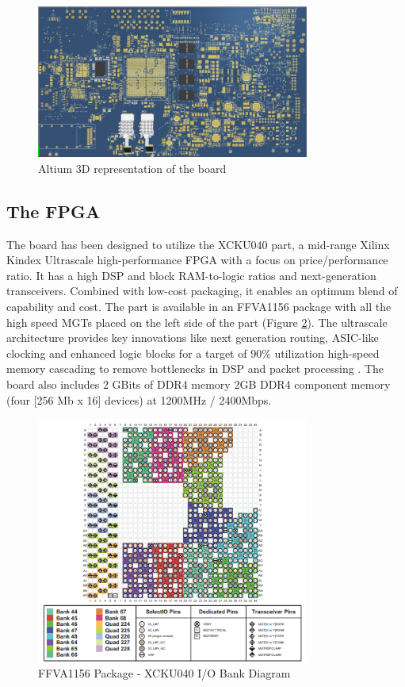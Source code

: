 \documentclass[a4paper]{PoS}
\begin{document}
\begin{figure}[h]
\centering
\includegraphics[width=0.8\textwidth]{board_3D_altium.png}
\caption{Altium 3D representation of the board}
\label{fig1}
\end{figure}



\subsection{The FPGA}
The board has been designed to utilize the XCKU040 part, a  mid-range Xilinx Kindex Ultrascale high-performance FPGA with a focus on price/performance ratio. It has a high DSP and block RAM-to-logic ratios and next-generation transceivers. Combined with low-cost packaging, it enables an optimum blend of capability and cost. The part is available in an FFVA1156 package with all the high speed MGTs  placed on the left side of the part (Figure \ref{xcku040}). The ultrascale architecture provides key innovations like next generation routing, ASIC-like clocking and enhanced logic blocks for a target of 90\% utilization high-speed memory cascading to remove bottlenecks in DSP and packet processing \cite{mehta2013xilinx}.
The board also includes 2 GBits of DDR4 memory 2GB DDR4 component memory (four [256 Mb x 16] devices) at 1200MHz / 2400Mbps.

\begin{figure}[h]
\centering
\includegraphics[width=0.8\textwidth]{xcku040_pinout.png}
\caption{FFVA1156 Package - XCKU040 I/O Bank Diagram}
\label{xcku040}
\end{figure}
\end{document}
